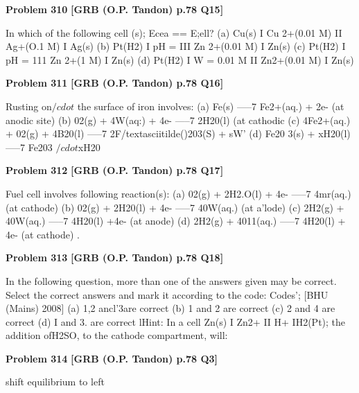 \begin{problembox}
\textbf{Problem 310} \hfill \textbf{[GRB (O.P. Tandon) p.78 Q15]}
\label{q:ext-grb_all_questions-310}

In which of the following cell (s); Ecea == E;ell? 
(a) Cu(s) I Cu 2+(0.01 M) II Ag+(O.1 M) I Ag(s) 
(b) Pt(H2) I pH = III Zn 2+(0.01 M) I Zn(s) 
(c) Pt(H2) I pH = 111 Zn 2+(1 M) I Zn(s) 
(d) Pt(H2) I W = 0.01 M II Zn2+(0.01 M) I Zn(s)
\end{problembox}

\begin{problembox}
\textbf{Problem 311} \hfill \textbf{[GRB (O.P. Tandon) p.78 Q16]}
\label{q:ext-grb_all_questions-311}

Rusting on$/cdot$ the surface of iron involves: 
(a) Fe(s) -----7 Fe2+(aq.) + 2e- (at anodic site) 
(b) 02(g) + 4W(aq:) + 4e- -----7 2H20(l) (at cathodic 
(c) 4Fe2+(aq.) + 02(g) + 4B20(l) -----7 2F/textasciitilde()203(S) + sW' 
(d) Fe20 3(s) + xH20(l) -----7 Fe203 $/cdot$xH20
\end{problembox}

\begin{problembox}
\textbf{Problem 312} \hfill \textbf{[GRB (O.P. Tandon) p.78 Q17]}
\label{q:ext-grb_all_questions-312}

Fuel cell involves following reaction(s): 
(a) 02(g) + 2H2.O(l) + 4e- -----7 4mr(aq.) (at cathode) 
(b) 02(g) + 2H20(l) + 4e- -----7 40W(aq.) (at a'lode) 
(c) 2H2(g) + 40W(aq.) -----7 4H20(l) +4e- (at anode) 
(d) 2H2(g) + 4011(aq.) -----7 4H20(l) + 4e- (at cathode) 
.
\end{problembox}

\begin{problembox}
\textbf{Problem 313} \hfill \textbf{[GRB (O.P. Tandon) p.78 Q18]}
\label{q:ext-grb_all_questions-313}

In the following question, more than one of the answers given 
may be correct. Select the correct answers and mark it 
according to the code: 
Codes'; 
[BHU (Mains) 2008] 
(a) 1,2 ancl'3are correct 
(b) 1 and 2 are correct 
(c) 2 and 4 are correct 
(d) I and 3. are correct 
lHint: In a cell Zn(s) I Zn2+ II H+ IH2(Pt); the addition ofH2SO, 
to the cathode compartment, will:
\end{problembox}

\begin{problembox}
\textbf{Problem 314} \hfill \textbf{[GRB (O.P. Tandon) p.78 Q3]}
\label{q:ext-grb_all_questions-314}

shift equilibrium to left
\end{problembox}

